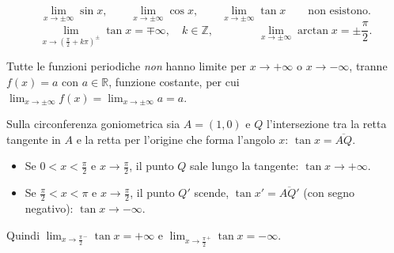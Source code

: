 \documentclass[11pt,a4paper]{article}
\begin{document}
\[
\lim_{x\to\pm\infty}\sin x, \qquad \lim_{x\to\pm\infty}\cos x, \qquad \lim_{x\to\pm\infty}\tan x \qquad\text{non esistono.}
\]
\[
\lim_{x\to\left(\frac{\pi}{2} + k\pi\right)^{\pm}} \tan x = \mp\infty, \quad k \in \mathbb{Z}, \qquad\qquad
\lim_{x\to\pm\infty}\arctan x = \pm\frac{\pi}{2}.
\]

\begin{proposizione}
Tutte le funzioni periodiche \emph{non} hanno limite per $x \to +\infty$ o $x \to -\infty$, tranne $f(x) = a$ con $a \in \mathbb{R}$, funzione costante, per cui $\displaystyle\lim_{x\to\pm\infty} f(x) = \lim_{x\to\pm\infty} a = a$.
\end{proposizione}

\begin{esempio}
Sulla circonferenza goniometrica sia $A = (1, 0)$ e $Q$ l'intersezione tra la retta tangente in $A$ e la retta per l'origine che forma l'angolo $x$: $\tan x = \overline{AQ}$.
\begin{itemize}
  \item Se $0 < x < \frac{\pi}{2}$ e $x \to \frac{\pi}{2}$, il punto $Q$ sale lungo la tangente: $\tan x \to +\infty$.
  \item Se $\frac{\pi}{2} < x < \pi$ e $x \to \frac{\pi}{2}$, il punto $Q'$ scende, $\tan x' = \overline{AQ'}$ (con segno negativo): $\tan x \to -\infty$.
\end{itemize}
Quindi $\displaystyle\lim_{x\to\frac{\pi}{2}^-}\tan x = +\infty$ e $\displaystyle\lim_{x\to\frac{\pi}{2}^+}\tan x = -\infty$.
\end{esempio}
\end{document}
